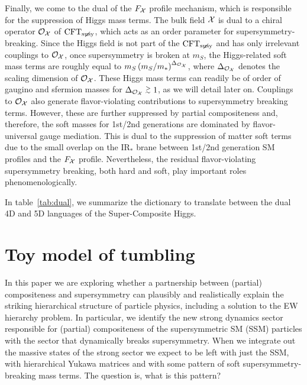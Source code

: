 \documentclass[a4paper,12pt]{article}
\newcommand{\gsim}{\stackrel{>}{_\sim}}
\def\tab#1{table~\ref{#1}}
\def\mst{m_*}
\def\mS{m_S}
\def\CFTs{{\rm CFT}_ {{\rm susy}\! \! \! \! \! \! \! \!\diagup \,\,\,}}
\begin{document}
Finally, we come to the dual of the $F_{\cal X}$ profile mechanism, which is responsible for the suppression of Higgs mass terms.
The bulk field ${\cal X}$   is dual to a chiral operator ${\cal O}_{\cal X}$ of $\CFTs$, which acts as an order parameter for supersymmetry-breaking.
Since the Higgs field is not part of the $\CFTs$ and has only irrelevant couplings to 
${\cal O}_{\cal X}$, once supersymmetry is broken at $\mS$, the
Higgs-related soft mass terms are roughly equal to $ \mS 
\left( \mS / \mst \right)^{ \Delta_{ {\cal O}_{\cal X}} }$, where $\Delta_{ {\cal O}_{\cal X} }$ denotes the scaling dimension of ${\cal O}_{\cal X}$.
These Higgs mass terms can readily be of order of gaugino and sfermion masses for $\Delta_{ {\cal O}_{\cal X} } \gsim 1$, as we will detail later on.
Couplings to ${\cal O}_{\cal X}$ also generate flavor-violating contributions to 
supersymmetry breaking terms.
However, these are further suppressed by
partial compositeness 
and, therefore,
the soft masses for 1st/2nd generations
are dominated by flavor-universal gauge mediation.
This is dual to the suppression of matter soft terms 
due to the small overlap on the IR$_*$ brane between
1st/2nd generation SM profiles
and the $F_{\cal X}$ profile. 
Nevertheless, the residual flavor-violating supersymmetry breaking, both hard and soft, play important roles phenomenologically. 

In \tab{tab:dual}, we summarize the dictionary to translate between the dual 4D and 5D languages of the Super-Composite Higgs.

\section{Toy model of tumbling}
\label{sec:tumbling}

In this paper we are exploring whether a partnership between (partial) compositeness and supersymmetry can plausibly and realistically explain the striking hierarchical structure of particle physics, including a solution to the EW hierarchy problem. In particular, we identify the new strong dynamics sector responsible for (partial) compositeness of the supersymmetric SM (SSM) particles with the sector that dynamically breaks supersymmetry. When we integrate out the massive states of the strong sector we expect to be left with just the SSM, with hierarchical Yukawa matrices and with some pattern of soft supersymmetry-breaking mass terms. The question is, what is this pattern?
\end{document}
